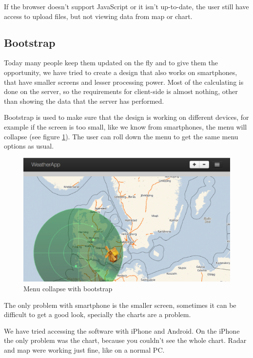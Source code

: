 If the browser doesn't support JavaScript or it isn't up-to-date, the user still have access to upload files, but not viewing data from map or chart.

\subsection{Bootstrap}
Today many people keep them updated on the fly and to give them the opportunity, we have tried to create a design that also works on smartphones, that have smaller screens and lesser processing power. Most of the calculating is done on the server, so the requirements for client-side is almost nothing, other than showing the data that the server has performed.

Bootstrap is used to make sure that the design is working on different devices, for example if the screen is too small, like we know from smartphones, the menu will collapse (see figure \ref{fig:bootstrap}). The user can roll down the menu to get the same menu options as usual.

\begin{figure}[htbp]
\centering
   \includegraphics[scale=.5]{figure/bootstrap.eps}
   \caption{Menu collapse with bootstrap}
   \label{fig:bootstrap}
\end{figure}

The only problem with smartphone is the smaller screen, sometimes it can be difficult to get a good look, specially the charts are a problem.

We have tried accessing the software with iPhone and Android. On the iPhone the only problem was the chart, because you couldn't see the whole chart. Radar and map were working just fine, like on a normal PC.

